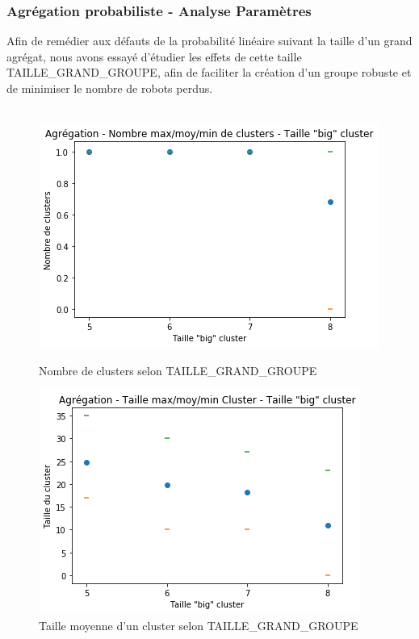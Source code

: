 \documentclass[a4paper]{article}
\begin{document}
\subsubsection{Agrégation probabiliste - Analyse Paramètres}
Afin de remédier aux défauts de la probabilité linéaire suivant la taille d'un grand agrégat, nous avons essayé d'étudier les effets de cette taille TAILLE\_GRAND\_GROUPE, afin de faciliter la création d'un groupe robuste et de minimiser le nombre de robots perdus.\\ \\
\begin{figure}[h]
	\begin{minipage}[c]{.46\linewidth}
		\centering
		\includegraphics[width=1.1\linewidth]{../../script_results/Agregation_nombre_clusters_big_cluster.png}
		\caption{Nombre de clusters selon TAILLE\_GRAND\_GROUPE}
	\end{minipage}
	\hfill%
	\begin{minipage}[c]{.46\linewidth}
		\centering
		\includegraphics[width=1.1\linewidth]{../../script_results/Agregation_taille_big_cluster.png}
		\caption{Taille moyenne d'un cluster selon TAILLE\_GRAND\_GROUPE}
	\end{minipage}
\end{figure}
\end{document}
